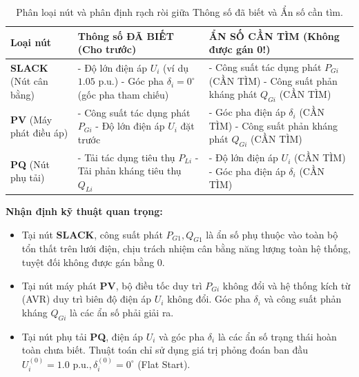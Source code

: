 \documentclass[12pt,a4paper,oneside]{report}
\begin{document}
\begin{table}[H]
\centering
\caption{Phân loại nút và phân định rạch ròi giữa Thông số đã biết và Ẩn số cần tìm.}
\label{tab:bus_classification}
\begin{tabularx}{\textwidth}{lXX}
\toprule
\textbf{Loại nút} & \textbf{Thông số ĐÃ BIẾT (Cho trước)} & \textbf{ẨN SỐ CẦN TÌM (Không được gán 0!)} \\
\midrule
\textbf{SLACK} (Nút cân bằng) & 
- Độ lớn điện áp $U_i$ (ví dụ $1.05\text{ p.u.}$) \newline
- Góc pha $\delta_i = 0^\circ$ (gốc pha tham chiếu) & 
- Công suất tác dụng phát $P_{Gi}$ (CẦN TÌM) \newline
- Công suất phản kháng phát $Q_{Gi}$ (CẦN TÌM) \\
\midrule
\textbf{PV} (Máy phát điều áp) & 
- Công suất tác dụng phát $P_{Gi}$ \newline
- Độ lớn điện áp $U_i$ đặt trước & 
- Góc pha điện áp $\delta_i$ (CẦN TÌM) \newline
- Công suất phản kháng phát $Q_{Gi}$ (CẦN TÌM) \\
\midrule
\textbf{PQ} (Nút phụ tải) & 
- Tải tác dụng tiêu thụ $P_{Li}$ \newline
- Tải phản kháng tiêu thụ $Q_{Li}$ & 
- Độ lớn điện áp $U_i$ (CẦN TÌM) \newline
- Góc pha điện áp $\delta_i$ (CẦN TÌM) \\
\bottomrule
\end{tabularx}
\end{table}

\noindent \textbf{Nhận định kỹ thuật quan trọng:}
\begin{itemize}
    \item Tại nút \textbf{SLACK}, công suất phát $P_{G1}, Q_{G1}$ là ẩn số phụ thuộc vào toàn bộ tổn thất trên lưới điện, chịu trách nhiệm cân bằng năng lượng toàn hệ thống, tuyệt đối không được gán bằng 0.
    \item Tại nút máy phát \textbf{PV}, bộ điều tốc duy trì $P_{Gi}$ không đổi và hệ thống kích từ (AVR) duy trì biên độ điện áp $U_i$ không đổi. Góc pha $\delta_i$ và công suất phản kháng $Q_{Gi}$ là các ẩn số phải giải ra.
    \item Tại nút phụ tải \textbf{PQ}, điện áp $U_i$ và góc pha $\delta_i$ là các ẩn số trạng thái hoàn toàn chưa biết. Thuật toán chỉ sử dụng giá trị phỏng đoán ban đầu $U_i^{(0)} = 1.0\text{ p.u.}, \delta_i^{(0)} = 0^\circ$ (Flat Start).
\end{itemize}
\end{document}

